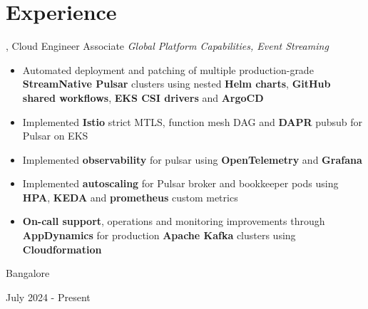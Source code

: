 \documentclass[10pt, letterpaper]{article}
\newenvironment{highlights}{
    \begin{itemize}[
        topsep=0.10 cm,
        parsep=0.10 cm,
        partopsep=0pt,
        itemsep=0pt,
        leftmargin=0.4 cm + 10pt
    ]
}{
    \end{itemize}
} %
\newenvironment{twocolentry}[2][]{
    \onecolentry
    \def\secondColumn{#2}
    \setcolumnwidth{\fill, 4.5 cm}
    \begin{paracol}{2}
}{
    \switchcolumn \raggedleft \secondColumn
    \end{paracol}
    \endonecolentry
} %
\let\hrefWithoutArrow\href
\renewcommand{\href}[2]{\hrefWithoutArrow{#1}{\ifthenelse{\equal{#2}{}}{ }{#2 }\raisebox{.15ex}{\footnotesize \faExternalLink*}}}
\begin{document}
    \section{Experience}    
        \begin{twocolentry}{
            Bangalore
            
        July 2024 - Present
        }
            \href{https://www.fico.com/en}{\textbf{FICO}}, Cloud Engineer Associate\newline
            \textit{Global Platform Capabilities, Event Streaming}
            \begin{highlights}
                \item Automated deployment and patching of multiple production-grade \textbf{StreamNative Pulsar} clusters using nested \textbf{Helm charts}, \textbf{GitHub shared workflows}, \textbf{EKS CSI drivers} and \textbf{ArgoCD} 
                \item Implemented \textbf{Istio} strict MTLS, function mesh DAG and \textbf{DAPR} pubsub for Pulsar on EKS
                \item Implemented \textbf{observability} for pulsar using \textbf{OpenTelemetry} and \textbf{Grafana}
                \item Implemented \textbf{autoscaling} for Pulsar broker and bookkeeper pods using \textbf{HPA}, \textbf{KEDA} and \textbf{prometheus} custom metrics
                \item \textbf{On-call support}, operations and monitoring improvements through \textbf{AppDynamics} for production \textbf{Apache Kafka} clusters using \textbf{Cloudformation}
            \end{highlights}
        \end{twocolentry}
        \vspace{0.2 cm}
\end{document}
